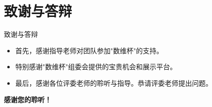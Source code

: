 \documentclass{beamer}
\begin{document}
\section*{致谢与答辩}
\begin{frame}{致谢与答辩}
    \justifying
    \begin{itemize}
        \item 首先，感谢指导老师对团队参加"数维杯"的支持。
        \item 特别感谢"数维杯"组委会提供的宝贵机会和展示平台。
        \item 最后，感谢各位评委老师的聆听与指导。恭请评委老师提出问题。
    \end{itemize}
    \vspace{1cm}
    \begin{center}
         {\Huge\textbf{感谢您的聆听！}}
    \end{center}
\end{frame}
\end{document}

